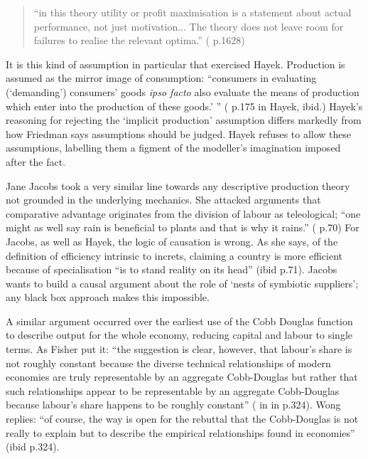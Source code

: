 \begin{quote}
``in this theory utility or profit maximisation is a statement about actual performance, not just motivation... The theory does not leave room for failures to realise the relevant optima.'' (\citealt{leijonhufvud_agent-based_2006} p.1628)
\end{quote}

It is this kind of assumption in particular that exercised Hayek. Production is assumed as the mirror image of consumption: ``consumers in evaluating (`demanding') consumers' goods \emph{ipso facto} also evaluate the means of production which enter into the production of these goods.' '' (\citealt{schumpeter_capitalism_1942} p.175 in Hayek, ibid.) Hayek's reasoning for rejecting the `implicit production' assumption differs markedly from how Friedman says assumptions should be judged. Hayek refuses to allow these assumptions, labelling them a figment of the modeller's imagination imposed after the fact. 

Jane Jacobs took a very similar line towards any descriptive production theory not grounded in the underlying mechanics. She attacked arguments that comparative advantage originates from the division of labour as teleological; ``one might as well say rain is beneficial to plants and that is why it rains.'' (\citealt{jacobs_cities_1986} p.70) For Jacobs, as well as Hayek, the logic of causation is wrong. As she says, of the definition of efficiency intrinsic to \gls{increts}, claiming a country is more efficient because of specialisation ``is to stand reality on its head'' (ibid p.71). Jacobs wants to build a causal argument about the role of `nests of symbiotic suppliers'; any black box approach makes this impossible. 


A similar argument occurred over the earliest use of the Cobb Douglas function to describe output for the whole economy, reducing capital and labour to single terms. As Fisher put it: ``the suggestion is clear, however, that labour's share is not roughly constant because the diverse technical relationships of modern economies are truly representable by an aggregate Cobb-Douglas but rather that such relationships appear to be representable by an aggregate Cobb-Douglas because labour's share happens to be roughly constant'' (\citealt{fisher_aggregate_1971} in \citealt{robinson_measure_1971} in \citealt{wong_`f-twist_1973} p.324). Wong replies: ``of course, the way is open for the rebuttal that the Cobb-Douglas is not really to explain but to describe the empirical relationships found in economies'' (ibid p.324). 

